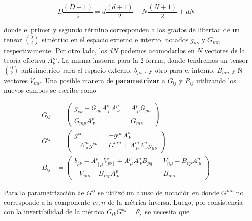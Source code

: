 \documentclass{article}
\numberwithin{equation}{section}
\begin{document}
\begin{equation}
D\frac{\left(D+1\right)}{2} = d\frac{\left(d+1\right)}{2} + N\frac{\left(N+1\right)}{2} +d N
\end{equation}

donde el primer y segundo término corresponden a los grados de libertad de un tensor $ \binom{0}{2} $ simétrico en el espacio externo e interno, notados $ g_{\mu \nu} $ y $ G_{m n} $ respectivamente. Por otro lado, los $ d N $ podemos acomodarlos en $ N $ vectores de la teoría efectiva $ A^m_{\nu} $. La misma historia para la 2-forma, donde tendremos un tensor $ \binom{0}{2} $ antisimétrico para el espacio externo, $ b_{\mu \nu} $ , y otro para el interno, $ B_{m n} $ y N vectores $ V_{m \nu} $. Una posible manera de \textbf{parametrizar} a $ G_{i j} $ y $ B_{i j} $ utilizando los nuevos campos se escribe como\\

\begin{boxquation}
	\begin{subequations}
	\begin{align}
	\label{Gdown}
	G_{i j}&= 
	\begin{pmatrix}
	g_{\mu \nu} + G_{o p} A^o_{\ \mu} A^p_{\ \nu} && A^p_{\ \mu} G_{p n}\\
	G_{m p} A^p_{\ \nu}  && G_{m n}
	\end{pmatrix}\\
	\label{Gup}
	G^{i j} &=
	\begin{pmatrix}
	g^{\mu \nu}  &&  - g^{\mu \nu} A^n_{\ \nu} \\
	- A^m_{\ \mu} g^{\mu \nu}  && G^{m n} + A^m_{\ \mu} A^n_{\ \nu} g_{\mu \nu}
	\end{pmatrix}\\
	\label{B}
	B_{i j} &=
	\begin{pmatrix}
	b_{\mu \nu} - A^p_{\ \left[\mu \right.} V_{\left. p \nu \right]} + A^p_{\ \mu}A^q_{\ \nu} B_{p q} && V_{n \mu} - B_{n p} A^p_{\ \mu}\\
	-V_{m \nu} + B_{m p} A^p_{\ \nu}  && B_{m n}
	\end{pmatrix}
	\end{align}
\end{subequations}
\end{boxquation}

\vspace{.4cm}

Para la parametrización de $ G^{i j} $ se utilizó un abuso de notación en donde $ G^{m n} $ no corresponde a la componente $ m, n $ de la métrica inversa. Luego, por consistencia con la invertibilidad de la métrica $ G_{i k} G^{k j} = \delta^i_j $, se necesita que \\
\end{document}
